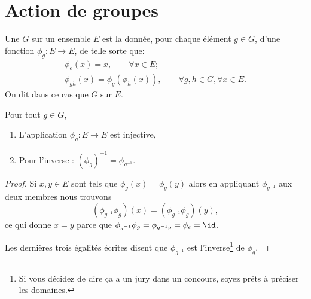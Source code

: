 \section{Action de groupes}

\begin{definition}  \label{DefActionGroupe}
    Une  \( G\) sur un ensemble \( E\) est la donnée, pour chaque élément \( g \in G\), d'une fonction \(\phi_g : E \to E \), de telle sorte que:
    \begin{gather*}
        \phi_{e}(x) = x, \hspace{2em} \forall x \in E;\\
        \phi_{gh}(x) = \phi_g (\phi_h (x)),  \hspace{2em} \forall g,h \in G, \forall x \in E.
     \end{gather*}
     On dit dans ce cas que \( G \)  sur \( E \).
\end{definition}

\begin{lemma}
    Pour tout \( g\in G\),
    \begin{enumerate}
        \item
            L'application \( \phi_g\colon E\to E\) est injective,
        \item
            Pour l'inverse : \( (\phi_g)^{-1}=\phi_{g^{-1}}\).
    \end{enumerate}
\end{lemma}

\begin{proof}
    Si \( x,y\in E\) sont tels que \( \phi_g(x)=\phi_g(y)\) alors en appliquant \( \phi_{g^{-1}}\) aux deux membres nous trouvons
    \begin{equation}
        (\phi_{g^{-1}}\phi_g)(x)=(\phi_{g^{-1}}\phi_g)(y),
    \end{equation}
    ce qui donne \( x=y\) parce que \( \phi_{g^{-1}}\phi_g=\phi_{g^{-1}g}=\phi_e=\id\).

    Les dernières trois égalités écrites disent que \( \phi_{g^{-1}}\) est l'inverse\footnote{Si vous décidez de dire ça a un jury dans un concours, soyez prêts à préciser les domaines.} de \( \phi_g\).
\end{proof}

